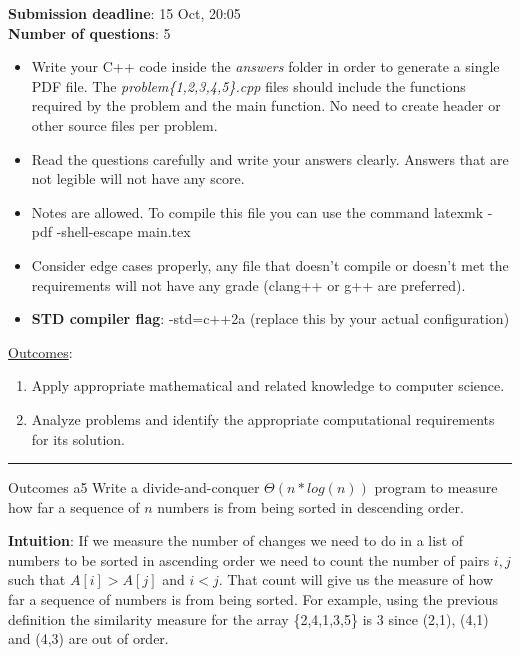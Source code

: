 



\textbf{Submission deadline}: 15 Oct, 20:05\\ 
\textbf{Number of questions}: 5

\begin{itemize}
    \item Write your C++ code inside the \emph{answers} folder in order to generate a single PDF file. 
        The \emph{problem\{1,2,3,4,5\}.cpp} files should include the functions required by the problem and the main function. 
        No need to create header or other source files per problem. 
    \item Read the questions carefully and write your answers clearly. Answers that are not legible will not have any score. 
    \item Notes are allowed. To compile this file you can use the command latexmk -pdf -shell-escape main.tex
    \item Consider edge cases properly, any file that doesn't compile or doesn't met the requirements will not have any grade (clang++ or g++ are preferred).
    \item \textbf{STD compiler flag}: -std=c++2a (replace this by your actual configuration)
\end{itemize}

\underline{Outcomes}:

\begin{enumerate}[label=\alph*.]
    \item Apply appropriate mathematical and related knowledge to computer science.
    \item Analyze problems and identify the appropriate computational requirements for its solution.
\end{enumerate}
\noindent\rule{\textwidth}{0.01pt}
\vspace{4mm}

\begin{problem}{Outcomes a}{5}
    Write a divide-and-conquer $\Theta(n*log(n))$ program to measure how far a sequence of $n$ numbers is from being sorted in descending order. \newline 

    \textbf{Intuition}: If we measure the number of changes we need to do in a list of numbers to be sorted in ascending order
    we need to count the number of pairs $i,j$ such that $A[i] > A[j]$ and $i<j$.
    That count will give us the measure of how far a sequence of numbers is from being sorted.
    For example, using the previous definition the similarity measure for the array \{2,4,1,3,5\} is 3 since (2,1), (4,1) and (4,3) are out of order.

    \inputminted[fontsize=\small,breaklines]{cpp}{answers/problem1/problem1.cpp}
\end{problem}

